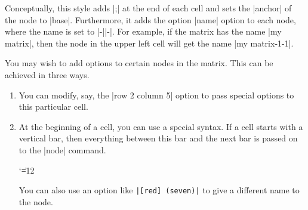 \begin{itemize}
  Conceptually, this style adds |;| at
  the end of each cell and sets the |anchor| of the node to
  |base|. Furthermore, it adds  the option |name| option to each node,
  where the name is set to  |-||-|. For  example, if the matrix has
  the name |my matrix|, then the node in  the upper left cell will get
  the name |my matrix-1-1|. 
\begin{codeexample}[]
\end{codeexample}

  You may wish to add options to certain nodes in the matrix. This can
  be achieved in three ways.
  \begin{enumerate}
  \item You can modify, say, the
    |row 2 column 5| option to pass special options to this particular
    cell.

\begin{codeexample}[]
\end{codeexample}
    
  \item At the beginning of a cell, you can use a special syntax. If a
    cell starts with a vertical bar, then everything between this bar
    and the next bar is passed on to the |node| command.
{\catcode`\|=12
\begin{codeexample}[]
\end{codeexample}
}
  You can also use an option like \verb!|[red] (seven)|! to give a
  different name to the node.


\end{enumerate}
\end{itemize}
